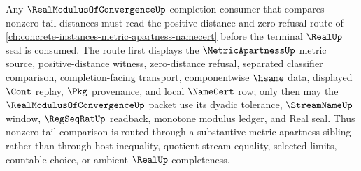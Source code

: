 Any $\RealModulusOfConvergenceUp$ completion consumer that compares nonzero tail distances must read the positive-distance and zero-refusal route of \autoref{ch:concrete-instances-metric-apartness-namecert} before the terminal $\RealUp$ seal is consumed. The route first displays the $\MetricApartnessUp$ metric source, positive-distance witness, zero-distance refusal, separated classifier comparison, completion-facing transport, componentwise $\hsame$ data, displayed $\Cont$ replay, $\Pkg$ provenance, and local $\NameCert$ row; only then may the $\RealModulusOfConvergenceUp$ packet use its dyadic tolerance, $\StreamNameUp$ window, $\RegSeqRatUp$ readback, monotone modulus ledger, and Real seal. Thus nonzero tail comparison is routed through a substantive metric-apartness sibling rather than through host inequality, quotient stream equality, selected limits, countable choice, or ambient $\RealUp$ completeness.
